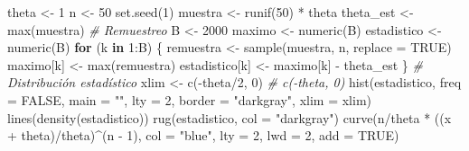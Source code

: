 \documentclass[
]{book}
\newenvironment{Shaded}{\begin{snugshade}}{\end{snugshade}}
\newcommand{\AttributeTok}[1]{\textcolor[rgb]{0.77,0.63,0.00}{#1}}
\newcommand{\CommentTok}[1]{\textcolor[rgb]{0.56,0.35,0.01}{\textit{#1}}}
\newcommand{\ConstantTok}[1]{\textcolor[rgb]{0.00,0.00,0.00}{#1}}
\newcommand{\ControlFlowTok}[1]{\textcolor[rgb]{0.13,0.29,0.53}{\textbf{#1}}}
\newcommand{\DecValTok}[1]{\textcolor[rgb]{0.00,0.00,0.81}{#1}}
\newcommand{\FunctionTok}[1]{\textcolor[rgb]{0.00,0.00,0.00}{#1}}
\newcommand{\NormalTok}[1]{#1}
\newcommand{\OtherTok}[1]{\textcolor[rgb]{0.56,0.35,0.01}{#1}}
\newcommand{\SpecialCharTok}[1]{\textcolor[rgb]{0.00,0.00,0.00}{#1}}
\newcommand{\StringTok}[1]{\textcolor[rgb]{0.31,0.60,0.02}{#1}}
\theoremstyle{break}
\theoremstyle{definition}
\theoremstyle{definition}
\theoremstyle{definition}
\theoremstyle{definition}
\theoremstyle{remark}
\begin{document}
\begin{Shaded}
\begin{Highlighting}[]
\NormalTok{theta }\OtherTok{\textless{}{-}} \DecValTok{1}
\NormalTok{n }\OtherTok{\textless{}{-}} \DecValTok{50}
\FunctionTok{set.seed}\NormalTok{(}\DecValTok{1}\NormalTok{)}
\NormalTok{muestra }\OtherTok{\textless{}{-}} \FunctionTok{runif}\NormalTok{(}\DecValTok{50}\NormalTok{) }\SpecialCharTok{*}\NormalTok{ theta}
\NormalTok{theta\_est }\OtherTok{\textless{}{-}} \FunctionTok{max}\NormalTok{(muestra)}
\CommentTok{\# Remuestreo}
\NormalTok{B }\OtherTok{\textless{}{-}} \DecValTok{2000}
\NormalTok{maximo }\OtherTok{\textless{}{-}} \FunctionTok{numeric}\NormalTok{(B)}
\NormalTok{estadistico }\OtherTok{\textless{}{-}} \FunctionTok{numeric}\NormalTok{(B)}
\ControlFlowTok{for}\NormalTok{ (k }\ControlFlowTok{in} \DecValTok{1}\SpecialCharTok{:}\NormalTok{B) \{}
\NormalTok{    remuestra }\OtherTok{\textless{}{-}} \FunctionTok{sample}\NormalTok{(muestra, n, }\AttributeTok{replace =} \ConstantTok{TRUE}\NormalTok{)}
\NormalTok{    maximo[k] }\OtherTok{\textless{}{-}} \FunctionTok{max}\NormalTok{(remuestra)}
\NormalTok{    estadistico[k] }\OtherTok{\textless{}{-}}\NormalTok{ maximo[k] }\SpecialCharTok{{-}}\NormalTok{ theta\_est}
\NormalTok{\}}
\CommentTok{\# Distribución estadístico}
\NormalTok{xlim }\OtherTok{\textless{}{-}} \FunctionTok{c}\NormalTok{(}\SpecialCharTok{{-}}\NormalTok{theta}\SpecialCharTok{/}\DecValTok{2}\NormalTok{, }\DecValTok{0}\NormalTok{) }\CommentTok{\# c({-}theta, 0)}
\FunctionTok{hist}\NormalTok{(estadistico, }\AttributeTok{freq =} \ConstantTok{FALSE}\NormalTok{, }\AttributeTok{main =} \StringTok{""}\NormalTok{, }\AttributeTok{lty =} \DecValTok{2}\NormalTok{, }
     \AttributeTok{border =} \StringTok{"darkgray"}\NormalTok{, }\AttributeTok{xlim =}\NormalTok{ xlim)}
\FunctionTok{lines}\NormalTok{(}\FunctionTok{density}\NormalTok{(estadistico))}
\FunctionTok{rug}\NormalTok{(estadistico, }\AttributeTok{col =} \StringTok{"darkgray"}\NormalTok{)}
\FunctionTok{curve}\NormalTok{(n}\SpecialCharTok{/}\NormalTok{theta }\SpecialCharTok{*}\NormalTok{ ((x }\SpecialCharTok{+}\NormalTok{ theta)}\SpecialCharTok{/}\NormalTok{theta)}\SpecialCharTok{\^{}}\NormalTok{(n }\SpecialCharTok{{-}} \DecValTok{1}\NormalTok{), }\AttributeTok{col =} \StringTok{"blue"}\NormalTok{, }\AttributeTok{lty =} \DecValTok{2}\NormalTok{, }\AttributeTok{lwd =} \DecValTok{2}\NormalTok{, }\AttributeTok{add =} \ConstantTok{TRUE}\NormalTok{)}
\end{Highlighting}
\end{Shaded}
\end{document}
